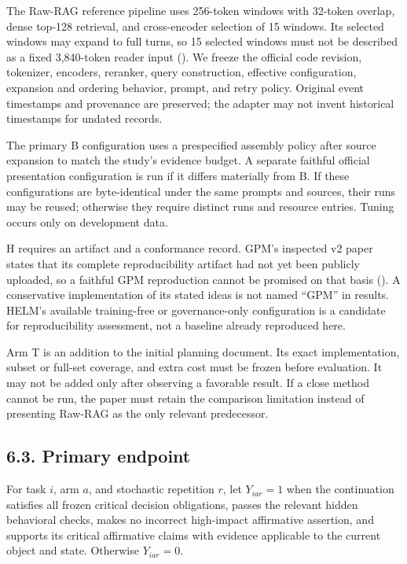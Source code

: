 \documentclass[
  11pt,
  a4paper,
]{article}
\begin{document}
The Raw-RAG reference pipeline uses 256-token windows with 32-token
overlap, dense top-128 retrieval, and cross-encoder selection of 15
windows. Its selected windows may expand to full turns, so 15 selected
windows must not be described as a fixed 3,840-token reader input
(). We freeze the official
code revision, tokenizer, encoders, reranker, query construction,
effective configuration, expansion and ordering behavior, prompt, and
retry policy. Original event timestamps and provenance are preserved;
the adapter may not invent historical timestamps for undated records.

The primary B configuration uses a prespecified assembly policy after
source expansion to match the study's evidence budget. A separate
faithful official presentation configuration is run if it differs
materially from B. If these configurations are byte-identical under the
same prompts and sources, their runs may be reused; otherwise they
require distinct runs and resource entries. Tuning occurs only on
development data.

H requires an artifact and a conformance record. GPM's inspected v2
paper states that its complete reproducibility artifact had not yet been
publicly uploaded, so a faithful GPM reproduction cannot be promised on
that basis (). A conservative
implementation of its stated ideas is not named ``GPM'' in results.
HELM's available training-free or governance-only configuration is a
candidate for reproducibility assessment, not a baseline already
reproduced here.

Arm T is an addition to the initial planning document. Its exact
implementation, subset or full-set coverage, and extra cost must be
frozen before evaluation. It may not be added only after observing a
favorable result. If a close method cannot be run, the paper must retain
the comparison limitation instead of presenting Raw-RAG as the only
relevant predecessor.

\subsection{6.3. Primary endpoint}\label{primary-endpoint}

For task \(i\), arm \(a\), and stochastic repetition \(r\), let
\(Y_{iar}=1\) when the continuation satisfies all frozen critical
decision obligations, passes the relevant hidden behavioral checks,
makes no incorrect high-impact affirmative assertion, and supports its
critical affirmative claims with evidence applicable to the current
object and state. Otherwise \(Y_{iar}=0\).
\end{document}
